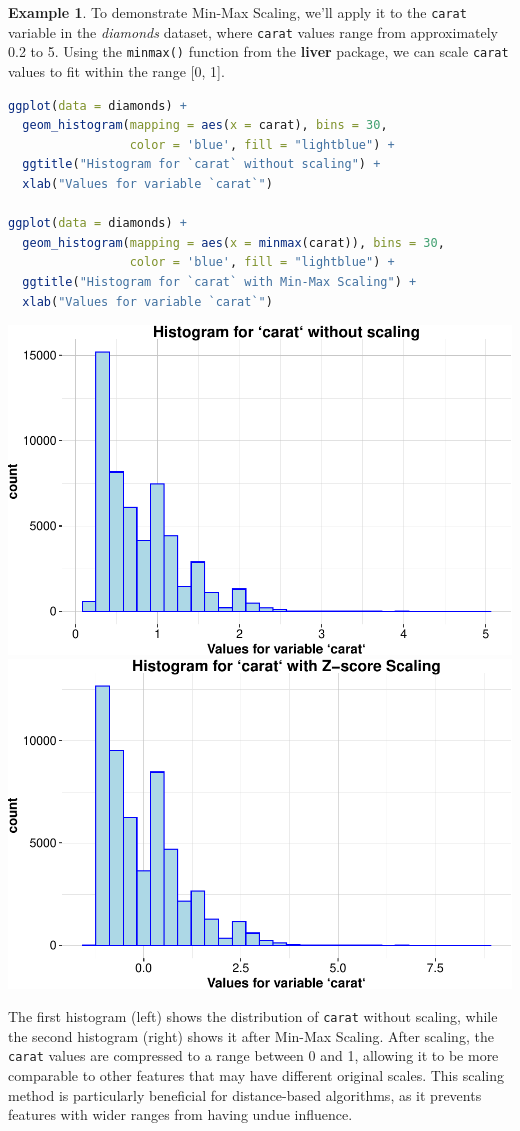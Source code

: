 \documentclass[
]{book}
\newcommand{\passthrough}[1]{#1}
\theoremstyle{definition}
\theoremstyle{definition}
\newtheorem{example}{Example}[chapter]
\theoremstyle{definition}
\theoremstyle{definition}
\theoremstyle{remark}
\begin{document}
\begin{example}
\protect\hypertarget{exm:ex-min-max}{}\label{exm:ex-min-max}To demonstrate Min-Max Scaling, we'll apply it to the \passthrough{\lstinline!carat!} variable in the \emph{diamonds} dataset, where \passthrough{\lstinline!carat!} values range from approximately 0.2 to 5. Using the \passthrough{\lstinline!minmax()!} function from the \textbf{liver} package, we can scale \passthrough{\lstinline!carat!} values to fit within the range {[}0, 1{]}.

\begin{lstlisting}[language=R]
ggplot(data = diamonds) +
  geom_histogram(mapping = aes(x = carat), bins = 30,
                 color = 'blue', fill = "lightblue") +
  ggtitle("Histogram for `carat` without scaling") + 
  xlab("Values for variable `carat`")

ggplot(data = diamonds) +
  geom_histogram(mapping = aes(x = minmax(carat)), bins = 30,
                 color = 'blue', fill = "lightblue") +
  ggtitle("Histogram for `carat` with Min-Max Scaling") + 
  xlab("Values for variable `carat`")
\end{lstlisting}

\includegraphics[width=0.5\linewidth]{data-preparation_files/figure-latex/unnamed-chunk-11-1} \includegraphics[width=0.5\linewidth]{data-preparation_files/figure-latex/unnamed-chunk-11-2}

The first histogram (left) shows the distribution of \passthrough{\lstinline!carat!} without scaling, while the second histogram (right) shows it after Min-Max Scaling. After scaling, the \passthrough{\lstinline!carat!} values are compressed to a range between 0 and 1, allowing it to be more comparable to other features that may have different original scales. This scaling method is particularly beneficial for distance-based algorithms, as it prevents features with wider ranges from having undue influence.
\end{example}
\end{document}
